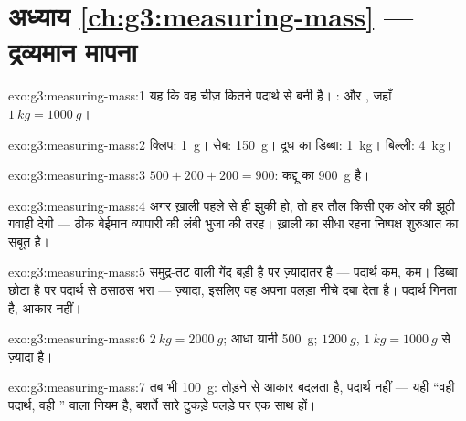 \section*{अध्याय \ref{ch:g3:measuring-mass} --- द्रव्यमान मापना}

\begin{solution}{exo:g3:measuring-mass:1}
यह कि वह चीज़ कितने पदार्थ से बनी है। :  और ,
जहाँ $\qty{1}{kg} = \qty{1000}{g}$।
\end{solution}

\begin{solution}{exo:g3:measuring-mass:2}
क्लिप: \qty{1}{g}। सेब: \qty{150}{g}। दूध का डिब्बा:
\qty{1}{kg}। बिल्ली: \qty{4}{kg}।
\end{solution}

\begin{solution}{exo:g3:measuring-mass:3}
$500 + 200 + 200 = 900$: कद्दू का  \qty{900}{g} है।
\end{solution}

\begin{solution}{exo:g3:measuring-mass:4}
अगर ख़ाली  पहले से ही झुकी हो, तो हर तौल किसी एक ओर की झूठी
गवाही देगी --- ठीक बेईमान व्यापारी की लंबी भुजा की तरह। ख़ाली 
का सीधा रहना निष्पक्ष शुरुआत का सबूत है।
\end{solution}

\begin{solution}{exo:g3:measuring-mass:5}
समुद्र-तट वाली गेंद बड़ी है पर ज़्यादातर  है --- पदार्थ कम,
 कम। डिब्बा छोटा है पर पदार्थ से ठसाठस भरा --- 
ज़्यादा, इसलिए वह अपना पलड़ा नीचे दबा देता है।  पदार्थ
गिनता है, आकार नहीं।
\end{solution}

\begin{solution}{exo:g3:measuring-mass:6}
$\qty{2}{kg} = \qty{2000}{g}$; आधा  यानी \qty{500}{g};
$\qty{1200}{g}$, $\qty{1}{kg} = \qty{1000}{g}$ से ज़्यादा है।
\end{solution}

\begin{solution}{exo:g3:measuring-mass:7}
तब भी \qty{100}{g}: तोड़ने से आकार बदलता है, पदार्थ नहीं ---
यही ``वही पदार्थ, वही '' वाला नियम है, बशर्ते सारे टुकड़े
पलड़े पर एक साथ हों।
\end{solution}

